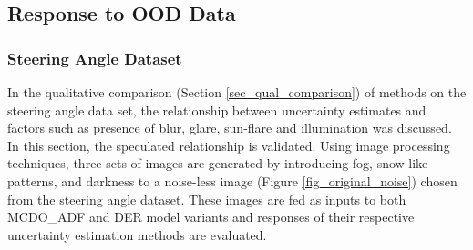 \subsection {Response to OOD Data}\label{subsec_ood}
\subsubsection{Steering Angle Dataset}
In the qualitative comparison (Section \ref{sec_qual_comparison}) of methods on the steering angle data set, the relationship between uncertainty estimates and factors such as presence of blur, glare, sun-flare and illumination was discussed. In this section, the speculated relationship is validated.
Using image processing techniques, three sets of images are generated by introducing fog, snow-like patterns, and darkness to a noise-less image (Figure \ref{fig_original_noise}) chosen from the steering angle dataset. These images are fed as inputs to both MCDO\_ADF and DER model variants and  responses of their respective uncertainty estimation methods are evaluated.
